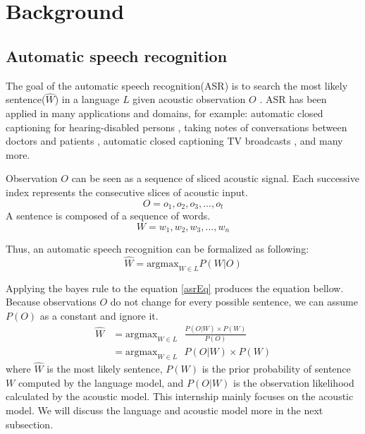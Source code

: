 \chapter{Background}

\section{Automatic speech recognition}
\label{subsec:ASR}
The goal of the automatic speech recognition(ASR) is to search the most likely sentence($\hat{W}$) in a language $L$ given acoustic observation $O$ \cite{Jurafsky:2009:SLP:1214993}. ASR has been applied in many applications and domains, for example: automatic closed captioning for hearing-disabled persons \cite{Patel2010}, taking notes of conversations between doctors and patients \cite{Klann2008}, automatic closed captioning TV broadcasts \cite{Woodland2015}, and many more.

Observation $O$ can be seen as a sequence of sliced acoustic signal. Each successive index represents the consecutive slices of acoustic input.
\begin{equation}
O=o_{1},o_{2},o_{3},...,o_{t}
\end{equation} 
A sentence is composed of a sequence of words.
\begin{equation}
W = w_{1},w_{2},w_{3},...,w_{n}
\end{equation}


Thus, an automatic speech recognition can be formalized as following:
\begin{equation}
\label{asrEq}
\hat{W} = \textrm{argmax}_{W \in L} P(W|O)
\end{equation}

Applying the bayes rule to the equation \ref{asrEq} produces the equation bellow. Because observations $O$ do not change for every possible sentence, we can assume $P(O)$ as a constant and ignore it.
\begin{align}
\hat{W} & = \textrm{argmax}_{W \in L} \textrm{ } \frac{P(O|W) \times P(W)}{P(O)} \\
	& = \textrm{argmax}_{W \in L} \textrm{ } P(O|W) \times P(W)
\end{align}
where $\hat{W}$ is the most likely sentence, $P(W)$ is the prior probability of sentence $W$ computed by the language model, and $P(O|W)$ is the observation likelihood calculated by the acoustic model. This internship mainly focuses on the acoustic model. We will discuss the language and acoustic model more in the next subsection. 



